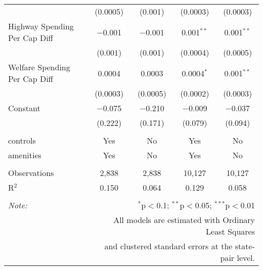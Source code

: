 \begin{table}[!htbp]
\begin{tabular}{@{\extracolsep{5pt}}lcccc}
  & (0.0005) & (0.001) & (0.0003) & (0.0003) \\ 
  Highway Spending Per Cap Diff & $-$0.001 & $-$0.001 & 0.001$^{**}$ & 0.001$^{**}$ \\ 
  & (0.001) & (0.001) & (0.0004) & (0.0005) \\ 
  Welfare Spending Per Cap Diff & 0.0004 & 0.0003 & 0.0004$^{*}$ & 0.001$^{**}$ \\ 
  & (0.0003) & (0.0005) & (0.0002) & (0.0003) \\ 
  Constant & $-$0.075 & $-$0.210 & $-$0.009 & $-$0.037 \\ 
  & (0.222) & (0.171) & (0.079) & (0.094) \\ 
 \hline \\[-1.8ex] 
controls & Yes & No & Yes & No \\ 
amenities & Yes & No & Yes & No \\ 
\hline \\[-1.8ex] 
Observations & 2,838 & 2,838 & 10,127 & 10,127 \\ 
R$^{2}$ & 0.150 & 0.064 & 0.129 & 0.058 \\ 
\hline 
\hline \\[-1.8ex] 
\textit{Note:}  & \multicolumn{4}{r}{$^{*}$p$<$0.1; $^{**}$p$<$0.05; $^{***}$p$<$0.01} \\ 
 & \multicolumn{4}{r}{All models are estimated with Ordinary Least Squares} \\ 
 & \multicolumn{4}{r}{and clustered standard errors at the state-pair level.} \\ 
\end{tabular} 
\end{table} 
